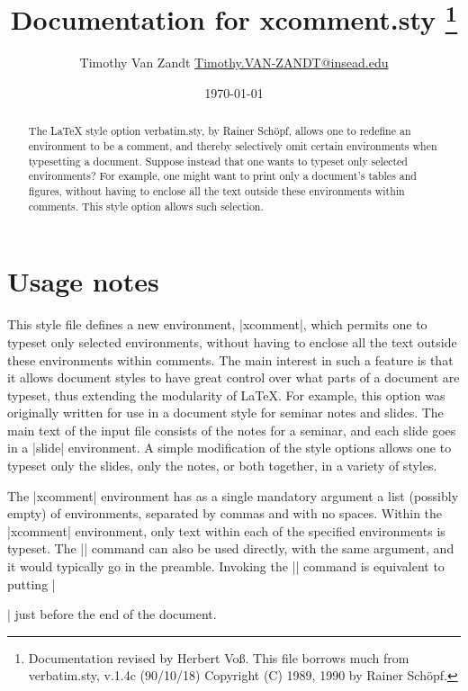 \documentclass[12pt]{article}
\title{Documentation for xcomment.sty%
   \thanks{Documentation revised by Herbert Vo\ss. 
   This file borrows much from verbatim.sty, v.1.4c (90/10/18)
  Copyright (C) 1989, 1990 by Rainer Sch\"opf.}}
\author{Timothy Van Zandt \url{Timothy.VAN-ZANDT@insead.edu}}
\date{\today}
\begin{document}
\maketitle
\clearpage
\tableofcontents

\clearpage
{}

\begin{abstract}
The \LaTeX{} style option verbatim.sty, by Rainer Sch\"opf, allows one to
redefine an environment to be a comment, and thereby selectively omit
certain environments when typesetting a document.
Suppose instead that one wants to typeset only selected environments? For
example, one might want to print only a document's tables and figures,
without having to enclose all the text outside these environments within
comments. This style option allows such selection.
\end{abstract}

\section{Usage notes}

This style file defines a new environment, |xcomment|, which permits one to
typeset only selected environments, without having to enclose all the text
outside these environments within comments. The main interest in such a
feature is that it allows document styles to have great control over what
parts of a document are typeset, thus extending the modularity of \LaTeX.
For example, this option was originally written for use in a document style
for seminar notes and slides. The main text of the input file consists of
the notes for a seminar, and each slide goes in a |slide| environment. A
simple modification of the style options allows one to typeset only the
slides, only the notes, or both together, in a variety of styles.


The |xcomment| environment has as a single mandatory argument a list
(possibly empty) of environments, separated by commas and with no spaces.
Within the |xcomment| environment, only text within each of the specified
environments is typeset.
The |\xcomment| command can also be used directly, with the same argument,
and it would typically go in the preamble. Invoking the |\xcomment| command
is equivalent to putting || just before the end of the document.
\end{document}

